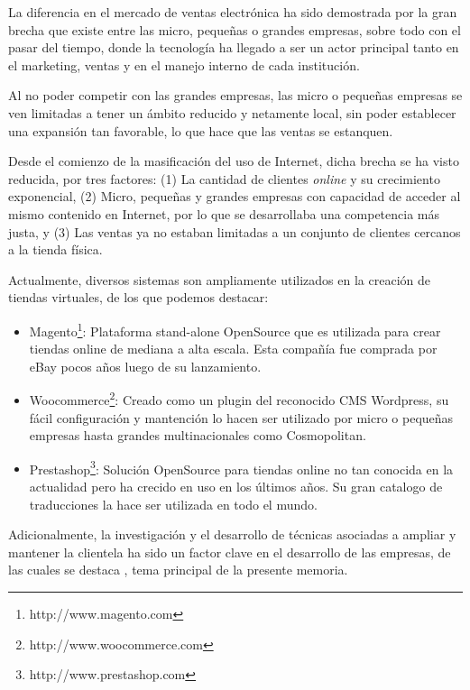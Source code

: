 La diferencia en el mercado de ventas electrónica ha sido demostrada por la gran
brecha que existe entre las micro, pequeñas o grandes empresas, sobre todo con el
pasar del tiempo, donde la tecnología ha llegado a ser un actor principal
tanto en el marketing, ventas y en el manejo interno de cada institución.

Al no poder competir con las grandes empresas, las micro o pequeñas empresas se ven
limitadas a tener un ámbito reducido y netamente local, sin poder establecer
una expansión tan favorable, lo que hace que las ventas se estanquen.

Desde el comienzo de la masificación del uso de Internet, dicha brecha se ha
visto reducida, por tres factores: (1) La cantidad de clientes \emph{online}
y su crecimiento exponencial, (2) Micro, pequeñas y grandes empresas con capacidad
de acceder al mismo contenido en Internet, por lo que se desarrollaba una competencia
más justa, y (3) Las ventas ya no estaban limitadas a un conjunto de clientes
cercanos a la tienda física.

Actualmente, diversos sistemas son ampliamente utilizados en la creación
de tiendas virtuales, de los que podemos destacar:

\begin{itemize}
    \item Magento\footnote{http://www.magento.com}:
        Plataforma stand-alone OpenSource que es utilizada para crear tiendas online
        de mediana a alta escala.
        Esta compañía fue comprada por eBay pocos años luego de su lanzamiento.

    \item Woocommerce\footnote{http://www.woocommerce.com}:
        Creado como un plugin del reconocido CMS Wordpress, su fácil configuración
        y mantención lo hacen ser utilizado por micro o pequeñas empresas hasta
        grandes multinacionales como Cosmopolitan.

    \item Prestashop\footnote{http://www.prestashop.com}:
        Solución OpenSource para tiendas online no tan conocida en la actualidad
        pero ha crecido en uso en los últimos años.
        Su gran catalogo de traducciones la hace ser utilizada en todo el mundo.

\end{itemize}

Adicionalmente, la investigación y el desarrollo de técnicas asociadas a ampliar
y mantener la clientela ha sido un factor clave en el desarrollo de las empresas,
de las cuales se destaca {\GAM}, tema principal de la presente memoria.

